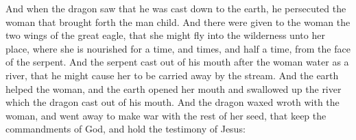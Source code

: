  And when the dragon saw that he was cast down to the earth, he persecuted the woman that brought forth the man child. 
 And there were given to the woman the two wings of the great eagle, that she might fly into the wilderness unto her place, where she is nourished for a time, and times, and half a time, from the face of the serpent. 
 And the serpent cast out of his mouth after the woman water as a river, that he might cause her to be carried away by the stream. 
 And the earth helped the woman, and the earth opened her mouth and swallowed up the river which the dragon cast out of his mouth. 
 And the dragon waxed wroth with the woman, and went away to make war with the rest of her seed, that keep the commandments of God, and hold the testimony of Jesus: 